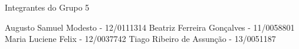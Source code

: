 \begin{folhadeaprovacao}

  \begin{center}
    {\ABNTEXchapterfont\large\imprimirautor}

    \vspace*{\fill}\vspace*{\fill}
    {\ABNTEXchapterfont\bfseries\Large\imprimirtitulo}
    \vspace*{\fill}

    Integrantes do Grupo 5

   \end{center}

   Augusto Samuel Modesto - 12/0111314
   Beatriz Ferreira Gonçalves - 11/0058801
   Maria Luciene Felix - 12/0037742
   Tiago Ribeiro de Assunção - 13/0051187

   
\end{folhadeaprovacao}
